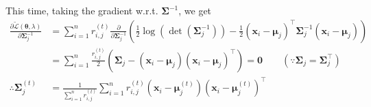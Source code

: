 \documentclass[11pt]{article}
\begin{document}
This time, taking the gradient w.r.t. $\bm\Sigma^{-1}$, we get
\begin{align*}
\frac{\partial\tilde{\mathcal{L}}(\bm\theta,\lambda)}{\partial\bm\Sigma_{j}^{-1}}
&=\sum_{i=1}^{n}r_{i,j}^{(t)}\frac{\partial}{\partial\bm\Sigma_{j}^{-1}}\left(\frac{1}{2}\log(\det(\bm\Sigma_{j}^{-1}))-\frac{1}{2}(\bm x_{i}-\bm\mu_{j})^{\top}\bm\Sigma_{j}^{-1}(\bm x_{i}-\bm\mu_{j})\right) \\
&=\sum_{i=1}^{n}\frac{r_{i,j}^{(t)}}{2}\left(\bm\Sigma_{j}-(\bm x_{i}-\bm\mu_{j})(\bm x_{i}-\bm\mu_{j})^{\top}\right)=\bm 0 \qquad (\because\bm\Sigma_{j}=\bm\Sigma_{j}^{\top}) \\
\therefore\bm\Sigma_{j}^{(t)}&=\frac{1}{\sum_{i=1}^{n}r_{i,j}^{(t)}}\sum_{i=1}^{n}r_{i,j}^{(t)}\left(\bm x_{i}-\bm\mu_{j}^{(t)}\right)\left(\bm x_{i}-\bm\mu_{j}^{(t)}\right)^{\top}
\end{align*}
\end{document}
